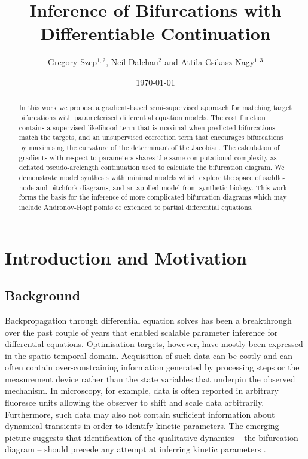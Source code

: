 



\title{Inference of Bifurcations with Differentiable Continuation}
\author{Gregory Szep$^{1,2}$, Neil Dalchau$^2$ and Attila Csikasz-Nagy$^{1,3}$}
\date{\today} \maketitle

\begin{abstract}
    In this work we propose a gradient-based semi-supervised approach for matching target bifurcations with parameterised differential equation models. The cost function contains a supervised likelihood term that is maximal when predicted bifurcations match the targets, and an unsupervised correction term that encourages bifurcations by maximising the curvature of the determinant of the Jacobian. The calculation of gradients with respect to parameters shares the same computational complexity as deflated pseudo-arclength continuation used to calculate the bifurcation diagram. We demonstrate model synthesis with minimal models which explore the space of saddle-node and pitchfork diagrams, and an applied model from synthetic biology. This work forms the basis for the inference of more complicated bifurcation diagrams which may include Andronov-Hopf points or extended to partial differential equations. 
\end{abstract}

\section{Introduction and Motivation}
\subsection{Background}
Backpropagation through differential equation solves has been a breakthrough over the past couple of years \cite{Chen2018NeuralEquations,Rackauckas2019DiffEqFlux.jl-AEquations} that enabled scalable parameter inference for differential equations. Optimisation targets, however, have mostly been expressed in the spatio-temporal domain. Acquisition of such data can be costly and can often contain over-constraining information generated by processing steps or the measurement device rather than the state variables that underpin the observed mechanism. In microscopy, for example, data is often reported in arbitrary fluoresce units allowing the observer to shift and scale data arbitrarily. Furthermore, such data may also not contain sufficient information about dynamical transients in order to identify kinetic parameters. The emerging picture suggests that identification of the qualitative dynamics -- the bifurcation diagram -- should precede any attempt at inferring kinetic parameters \cite{Stumpf2019ParameterBifurcations}.

